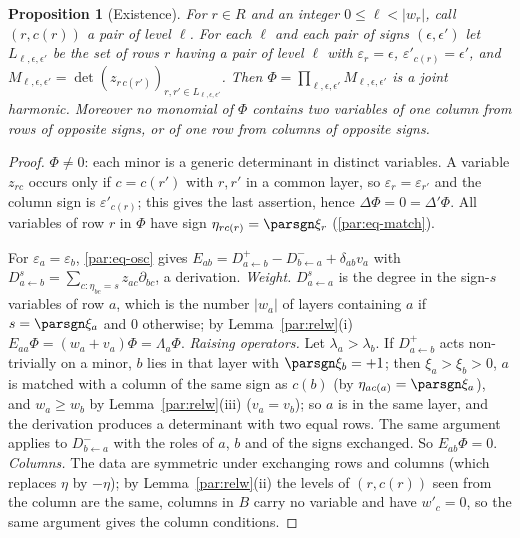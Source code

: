 \documentclass[10pt]{amsart}
\newtheorem{proposition}[theorem]{Proposition}
\theoremstyle{definition}
\theoremstyle{remark}
\begin{document}
\begin{proposition}[Existence]\label{par:exist}
For $r\in R$ and an integer $0\le\ell<|w_r|$, call $(r,c(r))$ a pair of \emph{level} $\ell$. For each
$\ell$ and each pair of signs $(\epsilon,\epsilon')$ let $L_{\ell,\epsilon,\epsilon'}$ be the set of
rows $r$ having a pair of level $\ell$ with $\varepsilon_r=\epsilon$, $\varepsilon'_{c(r)}=\epsilon'$, and
$M_{\ell,\epsilon,\epsilon'}=\det(z_{r\,c(r')})_{r,r'\in L_{\ell,\epsilon,\epsilon'}}$. Then
$\Phi=\prod_{\ell,\epsilon,\epsilon'}M_{\ell,\epsilon,\epsilon'}$ is a joint harmonic. Moreover no monomial
of $\Phi$ contains two variables of one column from rows of opposite signs, or of one row from columns
of opposite signs.
\end{proposition}
\begin{proof}
$\Phi\ne0$: each minor is a generic determinant in distinct variables. A variable $z_{rc}$ occurs only
if $c=c(r')$ with $r,r'$ in a common layer, so $\varepsilon_r=\varepsilon_{r'}$ and the column sign is
$\varepsilon'_{c(r)}$; this gives the last assertion, hence $\Delta\Phi=0=\Delta'\Phi$. All variables of
row $r$ in $\Phi$ have sign $\eta_{rc(r)}=\parsgn\xi_r$ (\eqref{par:eq-match}).

For $\varepsilon_a=\varepsilon_b$, \eqref{par:eq-osc} gives
$E_{ab}=D^+_{a\leftarrow b}-D^-_{b\leftarrow a}+\delta_{ab}v_a$ with
$D^s_{a\leftarrow b}=\sum_{c:\eta_{bc}=s}z_{ac}\partial_{bc}$, a derivation. \emph{Weight.} $D^s_{a\leftarrow a}$ is
the degree in the sign-$s$ variables of row $a$, which is the number $|w_a|$ of layers containing
$a$ if $s=\parsgn\xi_a$ and $0$ otherwise; by Lemma~\ref{par:relw}(i) $E_{aa}\Phi=(w_a+v_a)\Phi=
\Lambda_a\Phi$. \emph{Raising operators.} Let $\lambda_a>\lambda_b$. If $D^+_{a\leftarrow b}$ acts
non-trivially on a minor, $b$ lies in that layer with $\parsgn\xi_b=+1$; then $\xi_a>\xi_b>0$, $a$ is
matched with a column of the same sign as $c(b)$ (by $\eta_{ac(a)}=\parsgn\xi_a$), and
$w_a\ge w_b$ by Lemma~\ref{par:relw}(iii) ($v_a=v_b$); so $a$ is in the same layer, and the derivation
produces a determinant with two equal rows. The same argument applies to $D^-_{b\leftarrow a}$ with
the roles of $a$, $b$ and of the signs exchanged. So $E_{ab}\Phi=0$. \emph{Columns.} The data are
symmetric under exchanging rows and columns (which replaces $\eta$ by $-\eta$); by
Lemma~\ref{par:relw}(ii) the levels of $(r,c(r))$ seen from the column are the same, columns in $B$
carry no variable and have $w'_c=0$, so the same argument gives the column conditions.
\end{proof}
\end{document}
